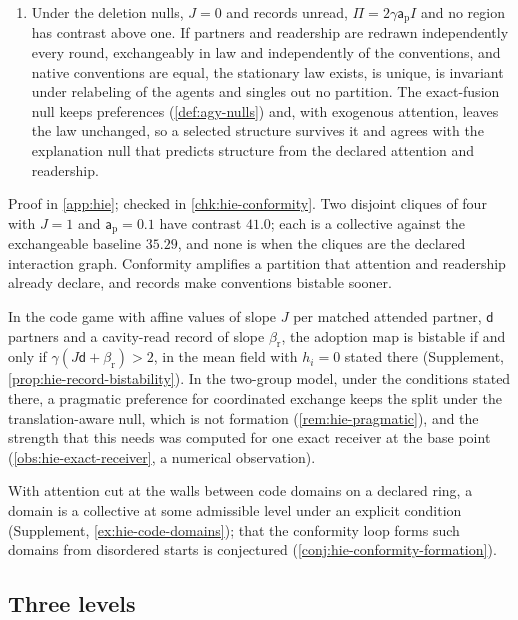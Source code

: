 \begin{proposition}
\begin{enumerate}
\item[(e)] Under the deletion nulls, $J=0$ and records unread, $\Pi=2\gamma\mathsf a_{\mathrm p}I$ and no region has contrast above one. If partners and readership are redrawn independently every round, exchangeably in law and independently of the conventions, and native conventions are equal, the stationary law exists, is unique, is invariant under relabeling of the agents and singles out no partition. The exact-fusion null keeps preferences (\cref{def:agy-nulls}) and, with exogenous attention, leaves the law unchanged, so a selected structure survives it and agrees with the explanation null that predicts structure from the declared attention and readership.
\end{enumerate}
\end{proposition}

Proof in \cref{app:hie}; checked in \cref{chk:hie-conformity}. Two disjoint cliques of four with $J=1$ and $\mathsf a_{\mathrm p}=0.1$ have contrast $41.0$; each is a collective against the exchangeable baseline $35.29$, and none is when the cliques are the declared interaction graph. Conformity amplifies a partition that attention and readership already declare, and records make conventions bistable sooner.

In the code game with affine values of slope $J$ per matched attended partner, $\mathsf d$ partners and a cavity-read record of slope $\beta_{\mathrm r}$, the adoption map is bistable if and only if $\gamma(J\mathsf d+\beta_{\mathrm r})>2$, in the mean field with $h_i=0$ stated there (Supplement, \cref{prop:hie-record-bistability}). In the two-group model, under the conditions stated there, a pragmatic preference for coordinated exchange keeps the split under the translation-aware null, which is not formation (\cref{rem:hie-pragmatic}), and the strength that this needs was computed for one exact receiver at the base point (\cref{obs:hie-exact-receiver}, a numerical observation).

With attention cut at the walls between code domains on a declared ring, a domain is a collective at some admissible level under an explicit condition (Supplement, \cref{ex:hie-code-domains}); that the conformity loop forms such domains from disordered starts is conjectured (\cref{conj:hie-conformity-formation}).

\subsection{Three levels}\label{sec:hie-three}

